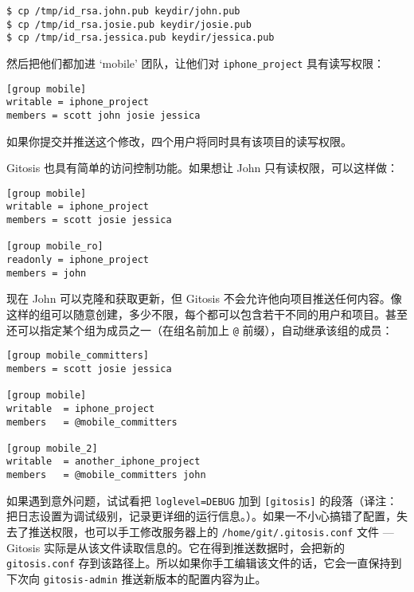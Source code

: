 \documentclass[a4paper]{book}
\newcounter{tab}[chapter]
\begin{document}
\begin{shaded}\begin{verbatim}
$ cp /tmp/id_rsa.john.pub keydir/john.pub
$ cp /tmp/id_rsa.josie.pub keydir/josie.pub
$ cp /tmp/id_rsa.jessica.pub keydir/jessica.pub
\end{verbatim}\end{shaded}

然后把他们都加进 `mobile' 团队，让他们对 \texttt{iphone\_project} 具有读写权限：

\begin{shaded}\begin{verbatim}
[group mobile]
writable = iphone_project
members = scott john josie jessica
\end{verbatim}\end{shaded}

如果你提交并推送这个修改，四个用户将同时具有该项目的读写权限。

Gitosis 也具有简单的访问控制功能。如果想让 John 只有读权限，可以这样做：

\begin{shaded}\begin{verbatim}
[group mobile]
writable = iphone_project
members = scott josie jessica

[group mobile_ro]
readonly = iphone_project
members = john
\end{verbatim}\end{shaded}

现在 John 可以克隆和获取更新，但 Gitosis 不会允许他向项目推送任何内容。像这样的组可以随意创建，多少不限，每个都可以包含若干不同的用户和项目。甚至还可以指定某个组为成员之一（在组名前加上 \texttt{@} 前缀），自动继承该组的成员：

\begin{shaded}\begin{verbatim}
[group mobile_committers]
members = scott josie jessica

[group mobile]
writable  = iphone_project
members   = @mobile_committers

[group mobile_2]
writable  = another_iphone_project
members   = @mobile_committers john
\end{verbatim}\end{shaded}

如果遇到意外问题，试试看把 \texttt{loglevel=DEBUG} 加到 \texttt{{[}gitosis{]}} 的段落（译注：把日志设置为调试级别，记录更详细的运行信息。）。如果一不小心搞错了配置，失去了推送权限，也可以手工修改服务器上的 \texttt{/home/git/.gitosis.conf} 文件 --- Gitosis 实际是从该文件读取信息的。它在得到推送数据时，会把新的 \texttt{gitosis.conf} 存到该路径上。所以如果你手工编辑该文件的话，它会一直保持到下次向 \texttt{gitosis-admin} 推送新版本的配置内容为止。
\end{document}

